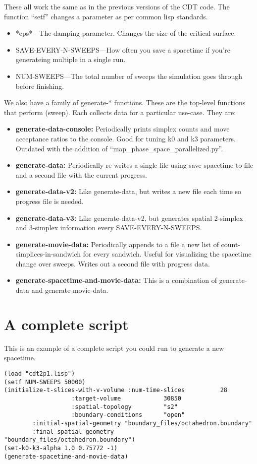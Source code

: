 \documentclass{article}
\begin{document}
These all work the same as in the previous versions of the CDT
code. The function ``setf'' changes a parameter as per common lisp
standards. 
\begin{itemize}
\item *eps*---The damping parameter. Changes the size of the critical surface.
\item SAVE-EVERY-N-SWEEPS---How often you save a spacetime if you're
  generateing multiple in a single run.
\item NUM-SWEEPS---The total number of sweeps the simulation goes
  through before finishing.
\end{itemize}

We also have a family of generate-* functions. These are the top-level
functions that perform (sweep). Each collects data for a particular
use-case. They are:
\begin{itemize}
\item \textbf{generate-data-console:} Periodically prints simplex
  counts and move acceptance ratios to the console. Good for tuning k0
  and k3 parameters. Outdated with the addition of
  ``map\_phase\_space\_parallelized.py''.
\item \textbf{generate-data:} Periodically re-writes a single file
  using save-spacetime-to-file and a second file with the current
  progress.
\item \textbf{generate-data-v2:} Like generate-data, but writes a new
  file each time so progress file is needed.
\item \textbf{generate-data-v3:} Like generate-data-v2, but generates
  spatial 2-simplex and 3-simplex information every
  SAVE-EVERY-N-SWEEPS.
\item \textbf{generate-movie-data:} Periodically appends to a file a
  new list of count-simplices-in-sandwich for every sandwich. Useful
  for visualizing the spacetime change over sweeps. Writes out a
  second file with progress data.
\item \textbf{generate-spacetime-and-movie-data:} This is a
  combination of generate-data and generate-movie-data.
\end{itemize}

\section{A complete script}
This is an example of a complete script you could run to generate a
new spacetime.
\begin{lstlisting}
(load "cdt2p1.lisp")
(setf NUM-SWEEPS 50000)
(initialize-t-slices-with-v-volume :num-time-slices          28
				   :target-volume            30850
				   :spatial-topology         "s2"
				   :boundary-conditions      "open"
        :initial-spatial-geometry "boundary_files/octahedron.boundary"
        :final-spatial-geometry   "boundary_files/octahedron.boundary")
(set-k0-k3-alpha 1.0 0.75772 -1)
(generate-spacetime-and-movie-data)
\end{lstlisting}
\end{document}
